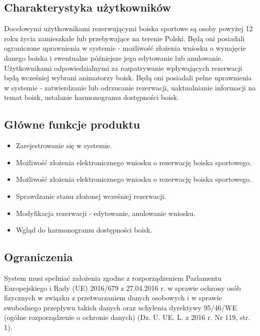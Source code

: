 \documentclass[a4paper,11pt]{article}
\begin{document}
\subsection {Charakterystyka użytkowników}
Docelowymi użytkownikami rezerwującymi boiska sportowe są osoby powyżej 12 roku życia zamieszkałe lub przebywające na terenie Polski. Będą oni posiadali ograniczone uprawnienia w systemie - możliwość złożenia wniosku o wynajęcie danego boiska i ewentualne późniejsze jego edytowanie lub anulowanie.
\\\indent
Użytkownikami odpowiedzialnymi za rozpatrywanie wpływających rezerwacji będą wcześniej wybrani animatorzy boisk. Będą oni posiadali pełne uprawnienia w systemie - zatwierdzanie lub odrzucanie rezerwacji, uaktualnianie informacji na temat boisk, ustalanie harmonogramu dostępności boisk.

\subsection {Główne funkcje produktu}
\begin{itemize}
	\item Zarejestrowanie się w systemie.
	\item Możliwość złożenia elektronicznego wniosku o rezerwację boiska sportowego.
	\item Możliwość złożenia elektronicznego wniosku o rezerwację boiska sportowego.
	\item Sprawdzanie stanu złożonej wcześniej rezerwacji.
	\item Modyfikacja rezerwacji - edytowanie, anulowanie wniosku.
	\item Wgląd do harmonogramu dostępności boisk.
\end{itemize} 

\subsection {Ograniczenia}
System musi spełniać założenia zgodne z rozporządzeniem Parlamentu Europejskiego i Rady (UE) 2016/679 z 27.04.2016 r. w sprawie ochrony osób fizycznych w związku z przetwarzaniem danych osobowych i w sprawie swobodnego przepływu takich danych oraz uchylenia dyrektywy 95/46/WE (ogólne rozporządzenie o ochronie danych) (Dz. U. UE. L. z 2016 r. Nr 119, str. 1).
\end{document}
